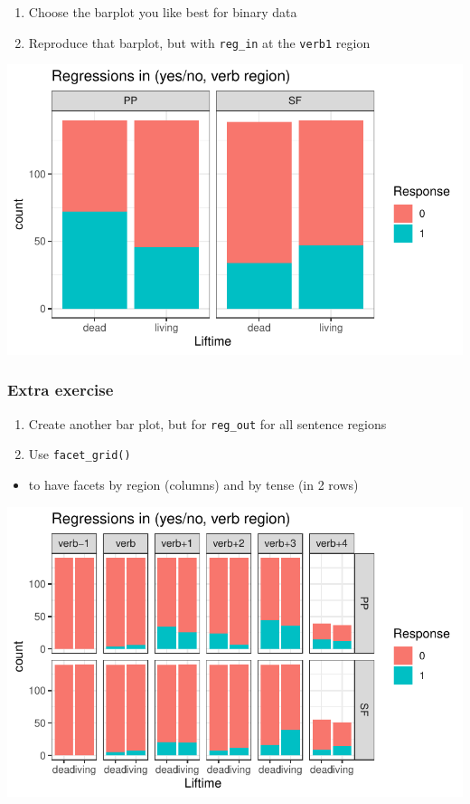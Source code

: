 \documentclass[
  letterpaper,
  DIV=11,
  numbers=noendperiod]{scrartcl}
\providecommand{\tightlist}{%
  \setlength{\itemsep}{0pt}\setlength{\parskip}{0pt}}\usepackage{longtable,booktabs,array}
\begin{document}
\begin{enumerate}
\def\labelenumi{\arabic{enumi}.}
\tightlist
\item
  Choose the barplot you like best for binary data
\item
  Reproduce that barplot, but with \texttt{reg\_in} at the
  \texttt{verb1} region
\end{enumerate}

\includegraphics{_data_viz_files/figure-pdf/unnamed-chunk-42-1.pdf}

\hypertarget{extra-exercise-1}{%
\subsubsection{Extra exercise}\label{extra-exercise-1}}

\begin{enumerate}
\def\labelenumi{\arabic{enumi}.}
\tightlist
\item
  Create another bar plot, but for \texttt{reg\_out} for all sentence
  regions
\item
  Use \texttt{facet\_grid()}
\end{enumerate}

\begin{itemize}
\tightlist
\item
  to have facets by region (columns) and by tense (in 2 rows)
\end{itemize}

\includegraphics{_data_viz_files/figure-pdf/unnamed-chunk-43-1.pdf}
\end{document}
